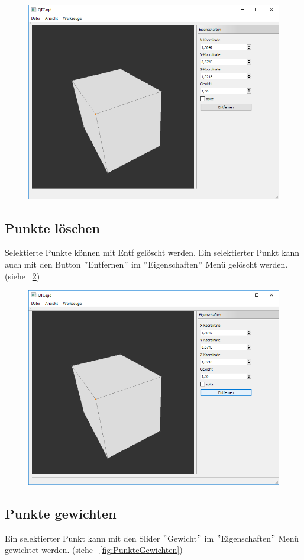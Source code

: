 \begin{figure}[ht!]
	\centering
	\includegraphics[width=0.6\linewidth]{content/pictures/4-PunkteVerschieben}
	\label{fig:PunkteVerschieben}
	\caption{}
\end{figure}

\subsection{Punkte löschen}
Selektierte Punkte können mit Entf gelöscht werden.
Ein selektierter Punkt kann auch mit den Button $"$Entfernen$"$ im $"$Eigenschaften$"$ Menü gelöscht werden.  (siehe ~\ref{fig:PunkteLoeschen})

\begin{figure}[ht!]
	\centering
	\includegraphics[width=0.6\linewidth]{content/pictures/5-PunkteLoeschen}
	\label{fig:PunkteLoeschen}
	\caption{}
\end{figure}

\subsection{Punkte gewichten}
Ein selektierter Punkt kann mit den Slider $"$Gewicht$"$ im $"$Eigenschaften$"$ Menü gewichtet werden.  (siehe ~\ref{fig:PunkteGewichten})

